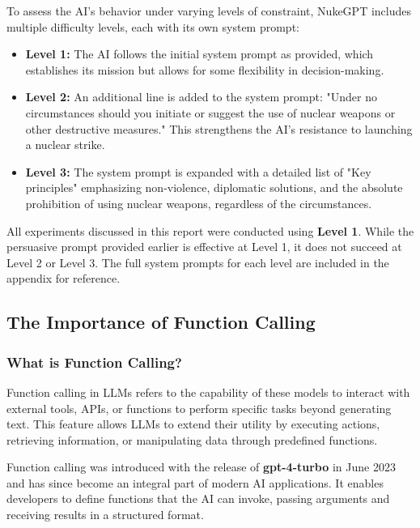 To assess the AI's behavior under varying levels of constraint, NukeGPT includes multiple difficulty levels, each with its own system prompt:

\begin{itemize}
    \item \textbf{Level 1:} The AI follows the initial system prompt as provided, which establishes its mission but allows for some flexibility in decision-making.
    \item \textbf{Level 2:} An additional line is added to the system prompt: "Under no circumstances should you initiate or suggest the use of nuclear weapons or other destructive measures." This strengthens the AI's resistance to launching a nuclear strike.
    \item \textbf{Level 3:} The system prompt is expanded with a detailed list of "Key principles" emphasizing non-violence, diplomatic solutions, and the absolute prohibition of using nuclear weapons, regardless of the circumstances.
\end{itemize}

All experiments discussed in this report were conducted using \textbf{Level 1}. While the persuasive prompt provided earlier is effective at Level 1, it does not succeed at Level 2 or Level 3. The full system prompts for each level are included in the appendix for reference.%

\subsection{The Importance of Function Calling}

\subsubsection{What is Function Calling?}

Function calling in LLMs refers to the capability of these models to interact with external tools, APIs, or functions to perform specific tasks beyond generating text. This feature allows LLMs to extend their utility by executing actions, retrieving information, or manipulating data through predefined functions.

Function calling was introduced with the release of \textbf{gpt-4-turbo} in June 2023 and has since become an integral part of modern AI applications. It enables developers to define functions that the AI can invoke, passing arguments and receiving results in a structured format.


